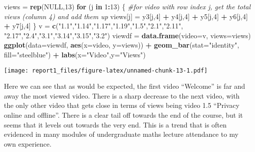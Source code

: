 \documentclass[
]{article}
\newenvironment{Shaded}{\begin{snugshade}}{\end{snugshade}}
\newcommand{\CommentTok}[1]{\textcolor[rgb]{0.56,0.35,0.01}{\textit{#1}}}
\newcommand{\ControlFlowTok}[1]{\textcolor[rgb]{0.13,0.29,0.53}{\textbf{#1}}}
\newcommand{\DataTypeTok}[1]{\textcolor[rgb]{0.13,0.29,0.53}{#1}}
\newcommand{\DecValTok}[1]{\textcolor[rgb]{0.00,0.00,0.81}{#1}}
\newcommand{\KeywordTok}[1]{\textcolor[rgb]{0.13,0.29,0.53}{\textbf{#1}}}
\newcommand{\NormalTok}[1]{#1}
\newcommand{\OperatorTok}[1]{\textcolor[rgb]{0.81,0.36,0.00}{\textbf{#1}}}
\newcommand{\OtherTok}[1]{\textcolor[rgb]{0.56,0.35,0.01}{#1}}
\newcommand{\StringTok}[1]{\textcolor[rgb]{0.31,0.60,0.02}{#1}}
\begin{document}
\begin{Shaded}
\begin{Highlighting}[]
\NormalTok{views =}\StringTok{ }\KeywordTok{rep}\NormalTok{(}\OtherTok{NULL}\NormalTok{,}\DecValTok{13}\NormalTok{)}
\ControlFlowTok{for}\NormalTok{ (j }\ControlFlowTok{in} \DecValTok{1}\OperatorTok{:}\DecValTok{13}\NormalTok{)}
\NormalTok{\{}
  \CommentTok{#for video with row index j, get the total views (column 4) and add them up}
\NormalTok{  views[j] =}\StringTok{ }\NormalTok{y3[j,}\DecValTok{4}\NormalTok{] }\OperatorTok{+}\StringTok{ }\NormalTok{y4[j,}\DecValTok{4}\NormalTok{] }\OperatorTok{+}\StringTok{ }\NormalTok{y5[j,}\DecValTok{4}\NormalTok{] }\OperatorTok{+}\StringTok{ }\NormalTok{y6[j,}\DecValTok{4}\NormalTok{] }\OperatorTok{+}\StringTok{ }\NormalTok{y7[j,}\DecValTok{4}\NormalTok{]}
\NormalTok{\}}
\NormalTok{v =}\StringTok{ }\KeywordTok{c}\NormalTok{(}\StringTok{"1.1"}\NormalTok{,}\StringTok{"1.14"}\NormalTok{,}\StringTok{"1.17"}\NormalTok{,}\StringTok{"1.19"}\NormalTok{,}\StringTok{"1.5"}\NormalTok{,}\StringTok{"2.1"}\NormalTok{,}\StringTok{"2.11"}\NormalTok{,}
      \StringTok{"2.17"}\NormalTok{,}\StringTok{"2.4"}\NormalTok{,}\StringTok{"3.1"}\NormalTok{,}\StringTok{"3.14"}\NormalTok{,}\StringTok{"3.15"}\NormalTok{,}\StringTok{"3.2"}\NormalTok{)}
\NormalTok{viewdf =}\StringTok{ }\KeywordTok{data.frame}\NormalTok{(}\DataTypeTok{video=}\NormalTok{v, }\DataTypeTok{views=}\NormalTok{views)}
\KeywordTok{ggplot}\NormalTok{(}\DataTypeTok{data=}\NormalTok{viewdf, }\KeywordTok{aes}\NormalTok{(}\DataTypeTok{x=}\NormalTok{video, }\DataTypeTok{y=}\NormalTok{views)) }\OperatorTok{+}\StringTok{ }
\StringTok{  }\KeywordTok{geom_bar}\NormalTok{(}\DataTypeTok{stat=}\StringTok{"identity"}\NormalTok{, }\DataTypeTok{fill=}\StringTok{"steelblue"}\NormalTok{) }\OperatorTok{+}\StringTok{ }
\StringTok{  }\KeywordTok{labs}\NormalTok{(}\DataTypeTok{x=}\StringTok{"Video"}\NormalTok{,}\DataTypeTok{y=}\StringTok{"Views"}\NormalTok{)}
\end{Highlighting}
\end{Shaded}

\texttt{[image: report1\_files/figure-latex/unnamed-chunk-13-1.pdf]}

Here we can see that as would be expected, the first video ``Welcome''
is far and away the most viewed video. There is a sharp decrease to the
next video, with the only other video that gets close in terms of views
being video 1.5 ``Privacy online and offline''. There is a clear tail
off towards the end of the course, but it seems that it levels out
towards the very end. This is a trend that is often evidenced in many
modules of undergraduate maths lecture attendance to my own experience.
\end{document}
